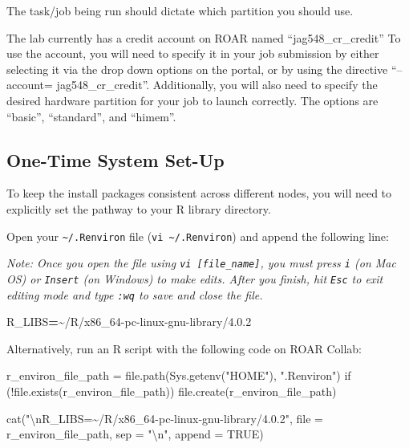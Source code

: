 \documentclass[
]{book}
\newenvironment{Shaded}{\begin{snugshade}}{\end{snugshade}}
\newcommand{\NormalTok}[1]{#1}
\newcommand{\OperatorTok}[1]{\textcolor[rgb]{0.81,0.36,0.00}{\textbf{#1}}}
\newcommand{\VariableTok}[1]{\textcolor[rgb]{0.00,0.00,0.00}{#1}}
\begin{document}
The task/job being run should dictate which partition you should use.

The lab currently has a credit account on ROAR named ``jag548\_cr\_credit'' To use the account, you will need to specify it in your job submission by either selecting it via the drop down options on the portal, or by using the directive ``--account= jag548\_cr\_credit''. Additionally, you will also need to specify the desired hardware partition for your job to launch correctly. The options are ``basic'', ``standard'', and ``himem''.

\subsection{One-Time System Set-Up}\label{one-time-system-set-up}

To keep the install packages consistent across different nodes, you will need to explicitly set the pathway to your R library directory.

Open your \texttt{\textasciitilde{}/.Renviron} file (\texttt{vi\ \textasciitilde{}/.Renviron}) and append the following line:

\emph{Note: Once you open the file using \texttt{vi\ {[}file\_name{]}}, you must press \texttt{i} (on Mac OS) or \texttt{Insert} (on Windows) to make edits. After you finish, hit \texttt{Esc} to exit editing mode and type \texttt{:wq} to save and close the file.}

\begin{Shaded}
\begin{Highlighting}[]
\VariableTok{R\_LIBS}\OperatorTok{=}\NormalTok{\textasciitilde{}/R/x86\_64{-}pc{-}linux{-}gnu{-}library/4.0.2}
\end{Highlighting}
\end{Shaded}

Alternatively, run an R script with the following code on ROAR Collab:

\begin{Shaded}
\begin{Highlighting}[]
\NormalTok{r\_environ\_file\_path = file.path(Sys.getenv("HOME"), ".Renviron")}
\NormalTok{if (!file.exists(r\_environ\_file\_path)) file.create(r\_environ\_file\_path)}

\NormalTok{cat("\textbackslash{}nR\_LIBS=\textasciitilde{}/R/x86\_64{-}pc{-}linux{-}gnu{-}library/4.0.2",}
\NormalTok{    file = r\_environ\_file\_path, sep = "\textbackslash{}n", append = TRUE)}
\end{Highlighting}
\end{Shaded}
\end{document}
